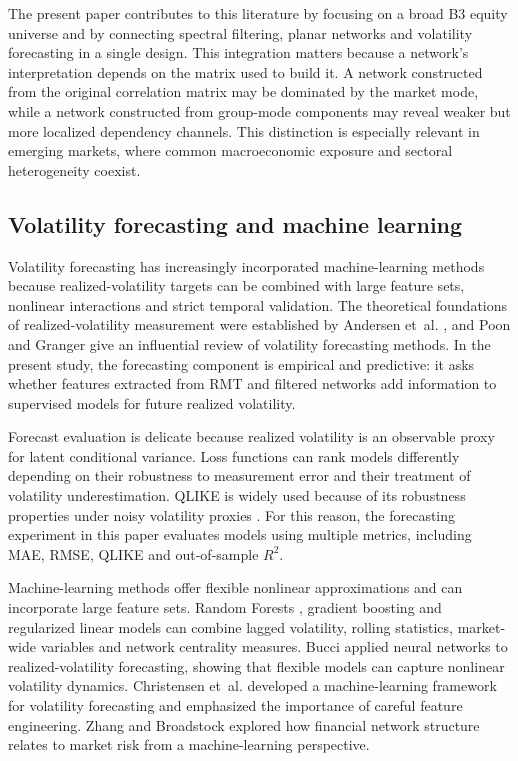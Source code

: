 The present paper contributes to this literature by focusing on a broad B3 equity universe and by connecting spectral filtering, planar networks and volatility forecasting in a single design. This integration matters because a network's interpretation depends on the matrix used to build it. A network constructed from the original correlation matrix may be dominated by the market mode, while a network constructed from group-mode components may reveal weaker but more localized dependency channels. This distinction is especially relevant in emerging markets, where common macroeconomic exposure and sectoral heterogeneity coexist.

\subsection{Volatility forecasting and machine learning}

Volatility forecasting has increasingly incorporated machine-learning methods because realized-volatility targets can be combined with large feature sets, nonlinear interactions and strict temporal validation. The theoretical foundations of realized-volatility measurement were established by Andersen et~al. \cite{andersen_2003_modeling}, and Poon and Granger \cite{poon_granger_2003} give an influential review of volatility forecasting methods. In the present study, the forecasting component is empirical and predictive: it asks whether features extracted from RMT and filtered networks add information to supervised models for future realized volatility.

Forecast evaluation is delicate because realized volatility is an observable proxy for latent conditional variance. Loss functions can rank models differently depending on their robustness to measurement error and their treatment of volatility underestimation. QLIKE is widely used because of its robustness properties under noisy volatility proxies \cite{patton_2011_volatility}. For this reason, the forecasting experiment in this paper evaluates models using multiple metrics, including MAE, RMSE, QLIKE and out-of-sample $R^2$.

Machine-learning methods offer flexible nonlinear approximations and can incorporate large feature sets. Random Forests \cite{breiman_2001_random}, gradient boosting \cite{friedman_2001_greedy} and regularized linear models \cite{hoerl_kennard_1970_ridge} can combine lagged volatility, rolling statistics, market-wide variables and network centrality measures. Bucci \cite{bucci_2020_realized} applied neural networks to realized-volatility forecasting, showing that flexible models can capture nonlinear volatility dynamics. Christensen et~al. \cite{christensen_2022_realized} developed a machine-learning framework for volatility forecasting and emphasized the importance of careful feature engineering. Zhang and Broadstock \cite{zhang_2023_network_volatility} explored how financial network structure relates to market risk from a machine-learning perspective.

